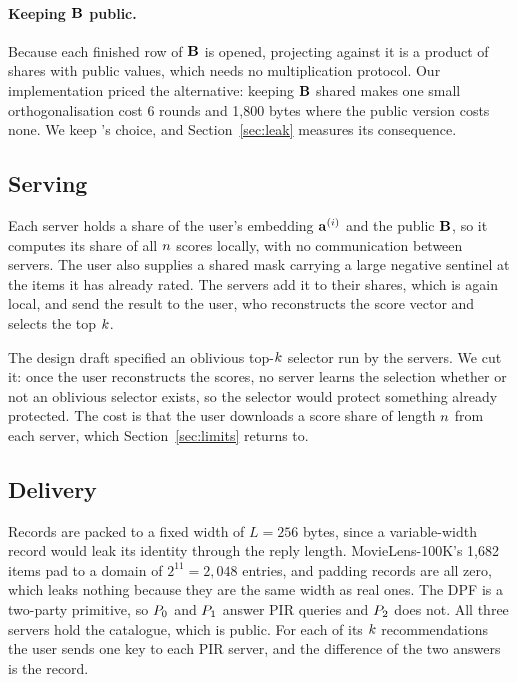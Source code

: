 \paragraph{Keeping $\mathbf{B}$ public.} Because each finished row of
$\mathbf{B}$ is opened, projecting against it is a product of shares with public
values, which needs no multiplication protocol. Our implementation priced the
alternative: keeping $\mathbf{B}$ shared makes one small orthogonalisation cost
6 rounds and 1{,}800 bytes where the public version costs none. We keep
\nudgeplain{}'s choice, and Section~\ref{sec:leak} measures its consequence.

\subsection{Serving}
\label{sec:design:serve}

Each server holds a share of the user's embedding $\mathbf{a}^{(i)}$ and the public
$\mathbf{B}$, so it computes its share of all $n$ scores locally, with no
communication between servers. The user also supplies a shared mask carrying a
large negative sentinel at the items it has already rated. The servers add it to
their shares, which is again local, and send the result to the user, who
reconstructs the score vector and selects the top $k$.

The design draft specified an oblivious top-$k$ selector run by the servers.
We cut it: once the user reconstructs the scores, no server learns the selection
whether or not an oblivious selector exists, so the selector would protect
something already protected. The cost is that the user downloads a score share of
length $n$ from each server, which Section~\ref{sec:limits} returns to.

\subsection{Delivery}
\label{sec:design:deliver}

Records are packed to a fixed width of $L = 256$ bytes, since a variable-width
record would leak its identity through the reply length. MovieLens-100K's 1{,}682
items pad to a domain of $2^{11} = 2{,}048$ entries, and padding records are all
zero, which leaks nothing because they are the same width as real ones. The DPF
is a two-party primitive, so $P_{0}$ and $P_{1}$ answer PIR queries and
$P_{2}$ does not. All three servers hold the catalogue, which is public. For
each of its $k$ recommendations the user sends one key to each PIR server,
and the difference of the two answers is the record.

